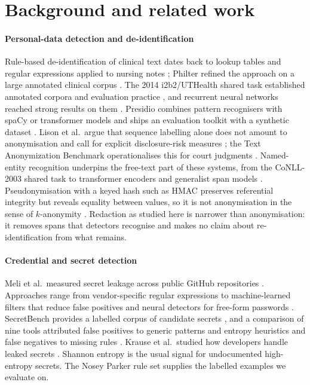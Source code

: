 \section{Background and related work}\label{sec:related}

\paragraph{Personal-data detection and de-identification}
Rule-based de-identification of clinical text dates back to lookup tables and regular expressions applied to nursing notes \cite{neamatullah2008deid}; Philter refined the approach on a large annotated clinical corpus \cite{norgeot2020philter}. The 2014 i2b2/UTHealth shared task established annotated corpora and evaluation practice \cite{stubbs2015annotating}, and recurrent neural networks reached strong results on them \cite{dernoncourt2017deid}. Presidio \cite{presidio} combines pattern recognisers with spaCy or transformer models and ships an evaluation toolkit with a synthetic dataset \cite{presidioresearch}. Lison et al.\ argue that sequence labelling alone does not amount to anonymisation and call for explicit disclosure-risk measures \cite{lison2021anonymisation}; the Text Anonymization Benchmark operationalises this for court judgments \cite{pilan2022tab}. Named-entity recognition underpins the free-text part of these systems, from the CoNLL-2003 shared task \cite{tjongkimsang2003conll} to transformer encoders \cite{devlin2019bert,sanh2019distilbert} and generalist span models \cite{zaratiana2024gliner}. Pseudonymisation with a keyed hash such as HMAC \cite{rfc2104} preserves referential integrity but reveals equality between values, so it is not anonymisation in the sense of $k$-anonymity \cite{sweeney2002kanonymity}. Redaction as studied here is narrower than anonymisation: it removes spans that detectors recognise and makes no claim about re-identification from what remains.

\paragraph{Credential and secret detection}
Meli et al.\ measured secret leakage across public GitHub repositories \cite{meli2019git}. Approaches range from vendor-specific regular expressions \cite{sinha2015secretkey} to machine-learned filters that reduce false positives \cite{saha2020secrets} and neural detectors for free-form passwords \cite{feng2022passfinder}. SecretBench provides a labelled corpus of candidate secrets \cite{basak2023secretbench}, and a comparison of nine tools attributed false positives to generic patterns and entropy heuristics and false negatives to missing rules \cite{basak2023comparative}. Krause et al.\ studied how developers handle leaked secrets \cite{krause2023pushed}. Shannon entropy \cite{shannon1948} is the usual signal for undocumented high-entropy secrets. The Nosey Parker rule set \cite{noseyparker} supplies the labelled examples we evaluate on.

